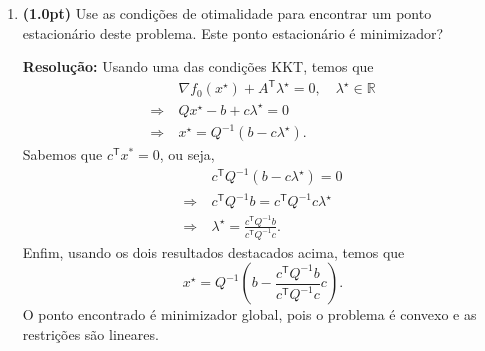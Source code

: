 \documentclass{article}
\newcommand{\R}{\mathbb{R}}
\newcommand{\T}{\mathsf{T}}
\begin{document}
\begin{enumerate}[resume*=exerc]
\begin{enumerate}[label=(\alph*),series=q3]
\item {\bf (1.0pt)} Use as condições de otimalidade para encontrar um ponto estacionário deste problema. Este ponto estacionário é minimizador?
\begin{framed}
{\bf Resolução:}
Usando uma das condições KKT, temos que
\begin{align*}
        & \nabla f_0(x^\star) + A^\T\lambda^\star = 0, \quad \lambda^\star\in\R\\
    \Rightarrow ~& Qx^\star - b + c\lambda^\star = 0\\
    \Rightarrow ~& \boxed{x^\star = Q^{-1} (b - c\lambda^\star)}.
\end{align*}
Sabemos que $c^\T x^* = 0$, ou seja,
\begin{align*}
        &c^\T Q^{-1} (b - c\lambda^\star) = 0\\
    \Rightarrow ~& c^\T Q^{-1} b = c^\T Q^{-1}c\lambda^\star\\
    \Rightarrow ~& \boxed{\lambda^\star = \frac{c^\T Q^{-1} b}{c^\T Q^{-1}c}}.
\end{align*}
Enfim, usando os dois resultados destacados acima, temos que
\[
x^\star = Q^{-1} \left(b - \frac{c^\T Q^{-1} b}{c^\T Q^{-1}c} c \right).
\]
O ponto encontrado é minimizador global, pois o problema é convexo e as restrições são lineares.
\vspace{5cm}
\end{framed}
\end{enumerate}
\end{enumerate}

\pagebreak
\end{document}
